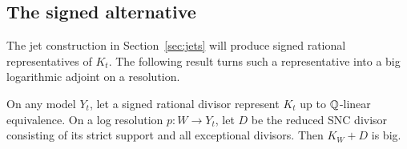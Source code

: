 \subsection{The signed alternative}

The jet construction in Section~\ref{sec:jets} will produce signed
rational representatives of \(K_t\). The following result turns
such a representative into a big logarithmic adjoint on a resolution.

\begin{proposition}\label{prop:signed-alternative}
On any model \(Y_t\), let a signed rational divisor
represent \(K_t\) up to \(\mathbb{Q}\)-linear equivalence. On a
log resolution \(p:W\to Y_t\), let \(D\) be the reduced
SNC divisor consisting of its strict support and all
exceptional divisors. Then \(K_W+D\) is big.
\end{proposition}
